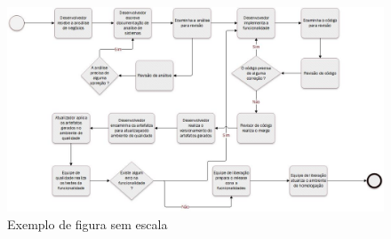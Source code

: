\documentclass[	DIV=calc,%
							paper=a4,%
							fontsize=12pt,%
							onecolumn]{scrartcl}	 					%
\begin{document}
\begin{figure}
	\centering
	\includegraphics[width=\textwidth]{processo_de_software_BPMN3}
	\caption{Exemplo de figura sem escala}
	\label{fig2}
\end{figure}

\end{document}
